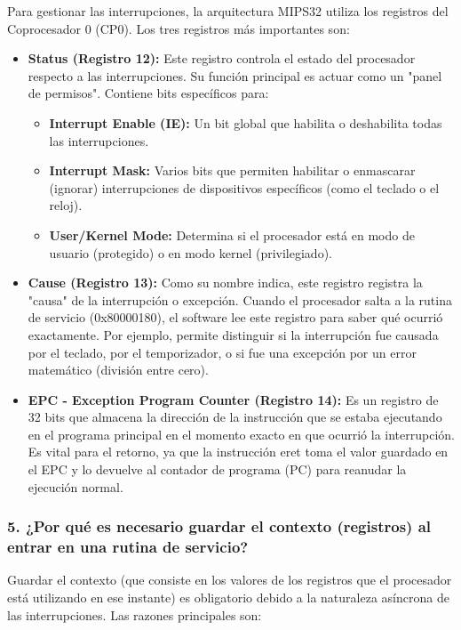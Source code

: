 \documentclass[12pt,a4paper]{article}
\begin{document}
Para gestionar las interrupciones, la arquitectura MIPS32 utiliza los registros del Coprocesador 0 (CP0). Los tres registros más importantes son:

\begin{itemize}
    \item \textbf{Status (Registro 12):} Este registro controla el estado del procesador respecto a las interrupciones. Su función principal es actuar como un "panel de permisos". Contiene bits específicos para:
    \begin{itemize}
        \item \textbf{Interrupt Enable (IE):} Un bit global que habilita o deshabilita todas las interrupciones.
        \item \textbf{Interrupt Mask:} Varios bits que permiten habilitar o enmascarar (ignorar) interrupciones de dispositivos específicos (como el teclado o el reloj).
        \item \textbf{User/Kernel Mode:} Determina si el procesador está en modo de usuario (protegido) o en modo kernel (privilegiado).
    \end{itemize}
    \item \textbf{Cause (Registro 13):} Como su nombre indica, este registro registra la "causa" de la interrupción o excepción. Cuando el procesador salta a la rutina de servicio (0x80000180), el software lee este registro para saber qué ocurrió exactamente. Por ejemplo, permite distinguir si la interrupción fue causada por el teclado, por el temporizador, o si fue una excepción por un error matemático (división entre cero).
    \item \textbf{EPC - Exception Program Counter (Registro 14):} Es un registro de 32 bits que almacena la dirección de la instrucción que se estaba ejecutando en el programa principal en el momento exacto en que ocurrió la interrupción. Es vital para el retorno, ya que la instrucción eret toma el valor guardado en el EPC y lo devuelve al contador de programa (PC) para reanudar la ejecución normal.
\end{itemize}

\subsubsection{5. ¿Por qué es necesario guardar el contexto (registros) al entrar en una rutina de servicio?}

Guardar el contexto (que consiste en los valores de los registros que el procesador está utilizando en ese instante) es obligatorio debido a la naturaleza asíncrona de las interrupciones. Las razones principales son:
\end{document}

